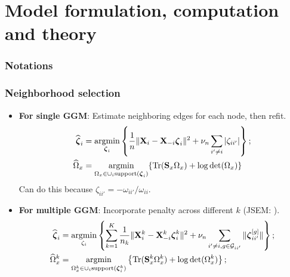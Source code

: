 \documentclass[10pt]{beamer}
\theoremstyle{definition}
\DeclareMathOperator*{\Tr}{Tr}
\DeclareMathOperator*{\argmin}{argmin}
\begin{document}
\section{Model formulation, computation and theory}

\begin{frame}
\frametitle{Notations}

\end{frame}

\begin{frame}
\frametitle{Neighborhood selection}

\begin{itemize}
\item {\bf For single GGM}: Estimate neighboring edges for each node, then refit.
%
\begin{align*}
\widehat \bfzeta_i &= \argmin_{\bfzeta_i} \left\{ \frac{1}{n} \| \bfX_i - \bfX_{-i} \bfzeta_i \|^2 + \nu_n \sum_{i' \neq i} |\zeta_{ii'}| \right\};\\
\widehat \Omega_x &= \argmin_{\Omega_x \in \cup_i \text{support} (\bfzeta_i)}
\{ \Tr (\bfS_x \Omega_x ) + \log \det(\Omega_x) \}
\end{align*}
%
Can do this because $\zeta_{ii'} = -\omega_{ii'}/\omega_{ii}$.

\item {\bf For multiple GGM}: Incorporate penalty across different $k$ (JSEM: \cite{MaMichailidis15}).
%
\begin{align*}
\widehat \bfzeta_i &= \argmin_{\zeta_i} \left\{ \sum_{k=1}^K \frac{1}{n_k} \| \bfX_i^k - \bfX_{-i}^k \bfzeta_i^k \|^2 + \nu_n \sum_{i' \neq i, g \in \cG_{ii'}} \| \bfzeta_{ii'}^{[g]} \| \right\};\\
\widehat \Omega_x^k &= \argmin_{\Omega_x^k \in \cup_i \text{support} (\bfzeta_i^k)}
\left\{ \Tr (\bfS_x^k \Omega_x^k ) + \log \det (\Omega_x^k ) \right\}; \end{align*}
%
\end{itemize}
\end{frame}
\end{document}
